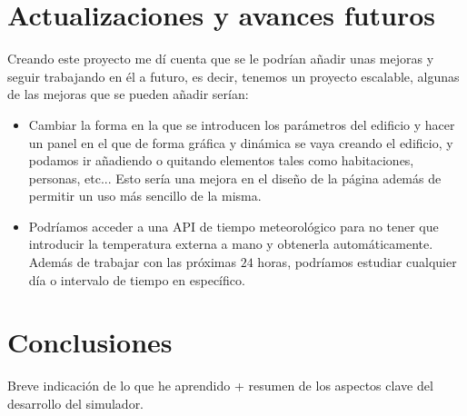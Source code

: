 \section{Actualizaciones y avances futuros}
Creando este proyecto me dí cuenta que se le podrían añadir unas mejoras y seguir trabajando en él a futuro, es decir, tenemos un proyecto escalable, algunas de las mejoras que se pueden añadir serían:
\begin{itemize}
	\item Cambiar la forma en la que se introducen los parámetros del edificio y hacer un panel en el que de forma gráfica y dinámica se vaya creando el edificio, y podamos ir añadiendo o quitando elementos tales como habitaciones, personas, etc... Esto sería una mejora en el diseño de la página además de permitir un uso más sencillo de la misma.
	\item Podríamos acceder a una API de tiempo meteorológico para no tener que introducir la temperatura externa a mano y obtenerla automáticamente. Además de trabajar con las próximas $24$ horas, podríamos estudiar cualquier día o intervalo de tiempo en específico.
\end{itemize}
\section{Conclusiones}
Breve indicación de lo que he aprendido + resumen de los aspectos clave del desarrollo del simulador.

\endinput
-